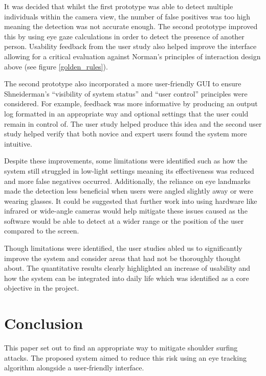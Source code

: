 \documentclass[12pt]{article}
\theoremstyle{plain}
\theoremstyle{definition}
\begin{document}
It was decided that whilst the first prototype was able to detect multiple individuals within the camera view, the number of false positives was too high meaning the detection was not accurate enough. The second prototype improved this by using eye gaze calculations in order to detect the presence of another person. Usability feedback from the user study also helped improve the interface allowing for a critical evaluation against Norman’s principles of interaction design \cite{norman_design_1983} above (see figure \ref{golden_rules}).

The second prototype also incorporated a more user-friendly GUI to ensure Shneiderman’s “visibility of system status” and “user control” principles \cite{ben_shneiderman_ben_nodate} were considered. For example, feedback was more informative by producing an output log formatted in an appropriate way and optional settings that the user could remain in control of. The user study helped produce this idea and the second user study helped verify that both novice and expert users found the system more intuitive.

Despite these improvements, some limitations were identified such as how the system still struggled in low-light settings meaning its effectiveness was reduced and more false negatives occurred. Additionally, the reliance on eye landmarks made the detection less beneficial when users were angled slightly away or were wearing glasses. It could be suggested that further work into using hardware like infrared or wide-angle cameras would help mitigate these issues caused as the software would be able to detect at a wider range or the position of the user compared to the screen.

Though limitations were identified, the user studies abled us to significantly improve the system and consider areas that had not be thoroughly thought about. The quantitative results clearly highlighted an increase of usability and how the system can be integrated into daily life which was identified as a core objective in the project.

\section{Conclusion}
\label{conclusion}

This paper set out to find an appropriate way to mitigate shoulder surfing attacks. The proposed system aimed to reduce this risk using an eye tracking algorithm alongside a user-friendly interface.
\end{document}
